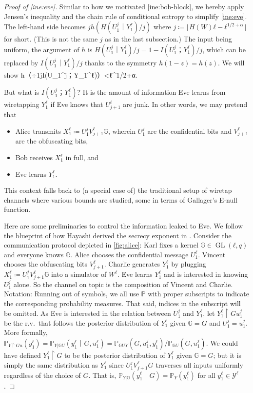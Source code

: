 \documentclass[openany]{amsbook}
\numberwithin{equation}{chapter}
\numberwithin{figure}{chapter}
\numberwithin{table}{chapter}
\DeclareMathOperator\GL{GL}
\def\[#1\]{\begin{equation*}{#1}\end{equation*}}
\theoremstyle{definition}	理dfn:Definition~?s			理exa:Example~?s
\theoremstyle{remark}		理cla:Claim~?s				理rem:Remark~?s
\begin{document}
	\begin{proof}[Proof of \cref{ine:eve}]
		Similar to how we motivated \cref{ine:bob-block},
		we hereby apply Jensen's inequality and the chain rule of
		conditional entropy to simplify \cref{ine:eve}.
		The left-hand side becomes $jh(H(U_1^j｜Y_1^ℓ)/j)$
		where $j≔⌊H(W)ℓ-ℓ^{1/2+α}⌋$ for short.
		(This is not the same $j$ as in the last subsection.)
		The input being uniform, the argument of $h$ is
		$H(U_1^j｜Y_1^ℓ)/j=1-I(U_1^j；Y_1^ℓ)/j$, which can be replaced by
		$I(U_1^j｜Y_1^ℓ)/j$ thanks to the symmetry $h(1-z)=h(z)$.
		We will show
		\[jh（÷1jI(U_1^j；Y_1^ℓ)）<ℓ^{1/2+α}.\label{ine:eve-block}\]
		
		But what is $I(U_1^j；Y_1^ℓ)$?
		It is the amount of information Eve learns from
		wiretapping $Y_1^ℓ$ if Eve knows that $U_{j+1}^ℓ$ are junk.
		In other words, we may pretend that
		\begin{itemize}
			\item	Alice transmits $X_1^ℓ≔U_1^jV_{j+1}^ℓ𝔾$, wherein $U_1^j$ are
					the confidential bits and $V_{j+1}^ℓ$ are the obfuscating bits,
			\item	Bob receives $X_1^ℓ$ in full, and
			\item	Eve learns $Y_1^ℓ$.
		\end{itemize}
		This context falls back to (a special case of) the traditional setup
		of wiretap channels \cite{Wyner75} where various bounds are studied,
		some in terms of Gallager's E-null function.
		
		Here are some preliminaries
		to control the information leaked to Eve.
		We follow the blueprint of how Hayashi derived
		the secrecy exponent in \cite[Inequality~(21)]{Hayashi06}.
		Consider the communication protocol depicted in \cref{fig:alice}:
		Karl fixes a kernel $𝔾∈\GL(ℓ,q)$ and everyone knows $𝔾$.
		Alice chooses the confidential message $U_1^ℓ$.
		Vincent chooses the obfuscating bits $V_{j+1}^ℓ$.
		Charlie generates $Y_1^ℓ$ by
		plugging $X_1^ℓ≔U_1^jV_{j+1}^ℓ𝔾$ into a simulator of $W^ℓ$.
		Eve learns $Y_1^ℓ$ and is interested in knowing $U_1^j$ alone.
		So the channel on topic is the composition of Vincent and Charlie.
		Notation:
		Running out of symbols, we all use $ℙ$ with proper subscripts
		to indicate the corresponding probability measures.
		That said, indices in the subscript will be omitted.
		As Eve is interested in the relation between $U_1^j$ and $Y_1^ℓ$,
		let $Y_1^ℓ↾Gu_1^j$ be the r.v.\ that follows
		the posterior distribution of $Y_1^ℓ$ given $𝔾=G$ and $U_1^j=u_1^j$.
		More formally, $ℙ_{Y↾Gu}(y_1^ℓ)
			=ℙ_{Y|𝔾U}(y_1^ℓ｜G,u_1^ℓ)=ℙ_{𝔾  UY}(G,u_1^j,y_1^ℓ)/ℙ_{𝔾U}(G,u_1^j)$.
		We could have defined $Y_1^ℓ↾G$ to be the
		posterior distribution of $Y_1^ℓ$ given $𝔾=G$;
		but it is simply the same distribution as $Y_1^ℓ$ since $U_1^jV_{j+1}^ℓG$
		traverses all inputs uniformly regardless of the choice of $G$.
		That is, $ℙ_{Y|𝔾}(y_1^ℓ｜G)=ℙ_Y(y_1^ℓ)$ for all $y_1^ℓ∈𝒴^ℓ$.
		

\end{proof}
\end{document}
